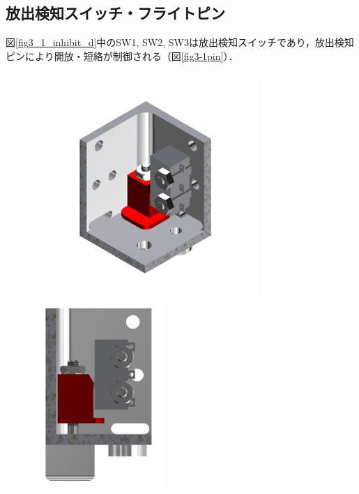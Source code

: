 \subsection{放出検知スイッチ・フライトピン}
図\ref{fig3_1_inhibit_d}中のSW1, SW2, SW3は放出検知スイッチであり，放出検知ピンにより開放・短絡が制御される（図\ref{fig3-1pin}）．

\begin{figure}[htbp]
	\begin{minipage}{0.32\hsize}
		\centering
		\includegraphics[height=0.7\linewidth]{./03/fig/pin_a.png}
	\end{minipage}
	\begin{minipage}{0.32\hsize}
		\centering
		\includegraphics[height=0.7\linewidth]{./03/fig/pin_b.png}
	\end{minipage}

\end{figure}
